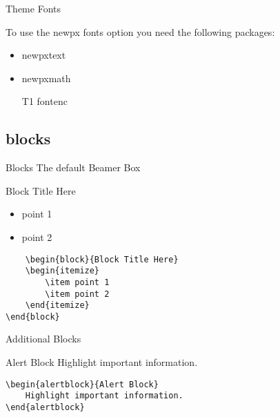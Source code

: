 \documentclass[compress,PxFont]{beamer}
\begin{document}

\begin{frame}{Theme Fonts}

To use the newpx fonts option you need the following packages:

\begin{itemize}
	\item newpxtext
	\item newpxmath
	\item [T1]fontenc
\end{itemize}


\end{frame}


\subsection{blocks}


\begin{frame}[containsverbatim]{Blocks}
The default Beamer Box
\begin{block}{Block Title Here}
	\begin{itemize}
		\item point 1
		\item point 2
	\end{itemize}
\end{block}
\begin{verbatim}
	\begin{block}{Block Title Here}
	\begin{itemize}
		\item point 1
		\item point 2
	\end{itemize}
\end{block}
\end{verbatim}
\end{frame}


\begin{frame}[containsverbatim]{Additional Blocks}
\begin{alertblock}{Alert Block}
	Highlight important information.
\end{alertblock}
\begin{verbatim}
\begin{alertblock}{Alert Block}
	Highlight important information.
\end{alertblock}
\end{verbatim}

\end{frame}
\end{document}
